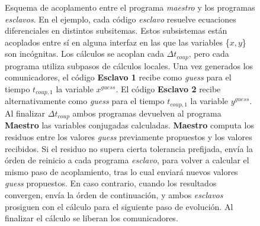 \begin{figure}
\caption[Esquema de acoplamiento entre programas implementado]{Esquema de acoplamento entre el programa \textit{maestro} y los programas \textit{esclavos}.
En el ejemplo, cada código \textit{esclavo} resuelve ecuaciones diferenciales en distintos subsitemas.
Estos subsistemas están acoplados entre sí en alguna interfaz en las que las variables \{$x,y$\} son incógnitas.
Los cálculos se acoplan cada $\Delta t_{coup}$, pero cada programa utiliza subpasos de cálculos locales.
Una vez generados los comunicadores,
el código \textbf{Esclavo 1} recibe como \textit{guess} para el tiempo $t_{coup,1}$ la variable $x^{guess}$.
El código \textbf{Esclavo 2} recibe alternativamente como \textit{guess} para el tiempo $t_{coup,1}$ la variable $y^{guess}$.
Al finalizar $\Delta t_{coup}$ ambos programas devuelven al programa \textbf{Maestro} las variables conjugadas calculadas.
\textbf{Maestro} computa los residuos entre los valores \textit{guess} previamente propuestos y los valores recibidos.
Si el residuo no supera cierta tolerancia prefijada, envía la órden de reinicio a cada programa \textit{esclavo}, 
para volver a calcular el mismo paso de acoplamiento, tras lo cual enviará nuevos valores \textit{guess} propuestos.
En caso contrario, cuando los resultados convergen, envía la órden de continuación, y ambos \textit{esclavos} prosiguen con el cálculo para el siguiente paso de evolución.
Al finalizar el cálculo se liberan los comunicadores.
}
\label{esquema-evolucion}
\end{figure}

